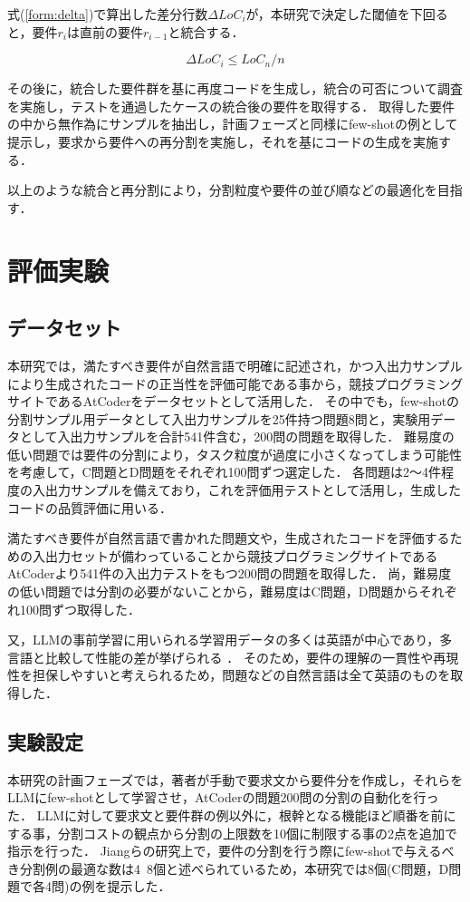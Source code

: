 \documentclass[submit,techrep,noauthor]{ipsj}
\begin{document}
式(\ref{form:delta})で算出した差分行数$\Delta LoC_i$が，本研究で決定した閾値を下回ると，要件$r_i$は直前の要件$r_{i-1}$と統合する．

\begin{equation}\label{form:delta}
    \Delta LoC_i \leq LoC_n / n
\end{equation}

その後に，統合した要件群を基に再度コードを生成し，統合の可否について調査を実施し，テストを通過したケースの統合後の要件を取得する．
取得した要件の中から無作為にサンプルを抽出し，計画フェーズと同様にfew-shotの例として提示し，要求から要件への再分割を実施し，それを基にコードの生成を実施する．

以上のような統合と再分割により，分割粒度や要件の並び順などの最適化を目指す．


\section{評価実験}
\label{sec:evaluation}

\subsection{データセット}
本研究では，満たすべき要件が自然言語で明確に記述され，かつ入出力サンプルにより生成されたコードの正当性を評価可能である事から，競技プログラミングサイトであるAtCoderをデータセットとして活用した．
その中でも，few-shotの分割サンプル用データとして入出力サンプルを25件持つ問題8問と，実験用データとして入出力サンプルを合計541件含む，200問の問題を取得した．
難易度の低い問題では要件の分割により，タスク粒度が過度に小さくなってしまう可能性を考慮して，C問題とD問題をそれぞれ100問ずつ選定した．
各問題は2〜4件程度の入出力サンプルを備えており，これを評価用テストとして活用し，生成したコードの品質評価に用いる．

満たすべき要件が自然言語で書かれた問題文や，生成されたコードを評価するための入出力セットが備わっていることから競技プログラミングサイトであるAtCoder\cite{AtCoder}より541件の入出力テストをもつ200問の問題を取得した．
尚，難易度の低い問題では分割の必要がないことから，難易度はC問題，D問題からそれぞれ100問ずつ取得した．

又，LLMの事前学習に用いられる学習用データの多くは英語が中心であり，多言語と比較して性能の差が挙げられる\cite{LLM_En} ．
そのため，要件の理解の一貫性や再現性を担保しやすいと考えられるため，問題などの自然言語は全て英語のものを取得した．

\subsection{実験設定}
本研究の計画フェーズでは，著者が手動で要求文から要件分を作成し，それらをLLMにfew-shotとして学習させ，AtCoderの問題200問の分割の自動化を行った．
LLMに対して要求文と要件群の例以外に，根幹となる機能ほど順番を前にする事，分割コストの観点から分割の上限数を10個に制限する事の2点を追加で指示を行った．
Jiangらの研究上で，要件の分割を行う際にfew-shotで与えるべき分割例の最適な数は4~8個と述べられているため，本研究では8個(C問題，D問題で各4問)の例を提示した．
\end{document}
